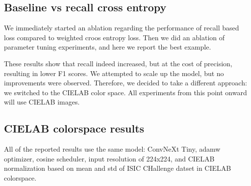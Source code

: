 \subsection{Baseline vs recall cross entropy}
We immediately started an ablation regarding the performance of recall based loss compared to weighted croos entropy loss. Then we did an ablation of parameter tuning experiments, and here we report the best example. 

\begin{table}[H]
\centering

\caption{Comparison of three configurations showing test accuracy, recall, F1, DPD, and group-wise recall for the malignant class.}
\label{tab:baseline-vs-variants}
\end{table}

These results show that recall indeed increased, but at the cost of precision, resulting in lower F1 scores. We attempted to scale up the model, but no improvements were observed. Therefore, we decided to take a different approach: we switched to the CIELAB color space. All experiments from this point onward will use CIELAB images.

\subsection{CIELAB colorspace results}

All of the reported results use the same model: ConvNeXt Tiny, adamw optimizer, cosine scheduler, input resolution of 224x224, and CIELAB normalization based on mean and std of ISIC CHallenge datset in CIELAB colorspace.


